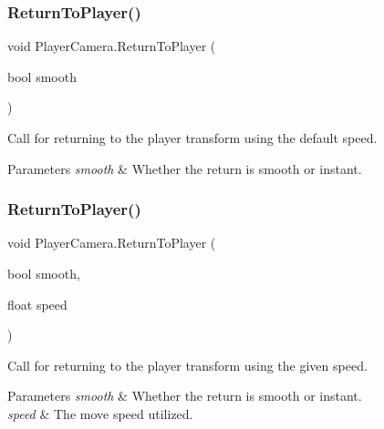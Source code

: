 \subsubsection{\texorpdfstring{Return\+To\+Player()}{ReturnToPlayer()}\hspace{0.1cm}{\footnotesize\ttfamily [1/2]}}
{\footnotesize\ttfamily void Player\+Camera.\+Return\+To\+Player (\begin{DoxyParamCaption}\item[{bool}]{smooth }\end{DoxyParamCaption})}



Call for returning to the player transform using the default speed. 


\begin{DoxyParams}{Parameters}
{\em smooth} & Whether the return is smooth or instant.\\
\hline
\end{DoxyParams}
\hypertarget{class_player_camera_a6dd3d2b6ed065f144db8070ed7f07ba0}{}\label{class_player_camera_a6dd3d2b6ed065f144db8070ed7f07ba0} 
\subsubsection{\texorpdfstring{Return\+To\+Player()}{ReturnToPlayer()}\hspace{0.1cm}{\footnotesize\ttfamily [2/2]}}
{\footnotesize\ttfamily void Player\+Camera.\+Return\+To\+Player (\begin{DoxyParamCaption}\item[{bool}]{smooth,  }\item[{float}]{speed }\end{DoxyParamCaption})}



Call for returning to the player transform using the given speed. 


\begin{DoxyParams}{Parameters}
{\em smooth} & Whether the return is smooth or instant.\\
\hline
{\em speed} & The move speed utilized.\\
\hline
\end{DoxyParams}
\hypertarget{class_player_camera_aac9819ce130c6466e191c967836245b6}{}\label{class_player_camera_aac9819ce130c6466e191c967836245b6} 
